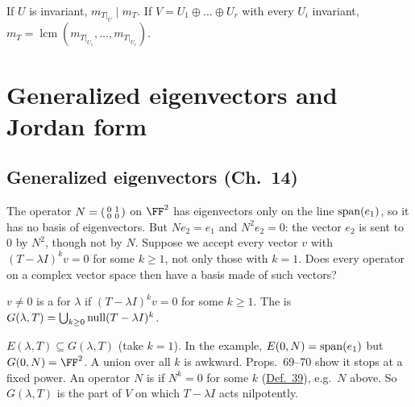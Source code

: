 \documentclass[10pt]{scrartcl}
\begin{document}
\begin{enumerate}[label=(T\arabic*),leftmargin=2.6em,itemsep=8pt]
\begin{enumerate}[(a)]
    \ii If $U$ is invariant, $m_{T|_U}\mid m_T$.
    \ii If $V=U_1\oplus\dots\oplus U_r$ with every $U_i$ invariant, $m_T=\operatorname{lcm}(m_{T|_{U_1}},\dots,m_{T|_{U_r}})$.
  \end{enumerate}
\end{enumerate}

\section{Generalized eigenvectors and Jordan form}
\subsection{Generalized eigenvectors (Ch.~14)}

\begin{qbox}
  The operator $N=\begin{psmallmatrix}0&1\\0&0\end{psmallmatrix}$ on $\FF^2$ has eigenvectors only on the line $\operatorname{span}(e_1)$, so it has no basis of eigenvectors. But $Ne_2=e_1$ and $N^2e_2=0$: the vector $e_2$ is sent to $0$ by $N^2$, though not by $N$. Suppose we accept every vector $v$ with $(T-\lambda I)^kv=0$ for some $k\ge1$, not only those with $k=1$. Does every operator on a complex vector space then have a basis made of such vectors?
\end{qbox}

\begin{definition*}\hypertarget{def-37}{}\label{def-37}
  $v\ne0$ is a  for $\lambda$ if $(T-\lambda I)^kv=0$ for some $k\ge1$. The  is $G(\lambda,T)=\bigcup_{k\ge0}\operatorname{null}(T-\lambda I)^k$.
\end{definition*}
\begin{itemize}
  \ii $E(\lambda,T)\subseteq G(\lambda,T)$ (take $k=1$). In the example, $E(0,N)=\operatorname{span}(e_1)$ but $G(0,N)=\FF^2$.
  \ii A union over all $k$ is awkward. Props.~69--70 show it stops at a fixed power.
  \ii An operator $N$ is  if $N^k=0$ for some $k$ (\hyperref[def-39]{Def.~39}), e.g.\ $N$ above. So $G(\lambda,T)$ is the part of $V$ on which $T-\lambda I$ acts nilpotently.
\end{itemize}
\end{document}

